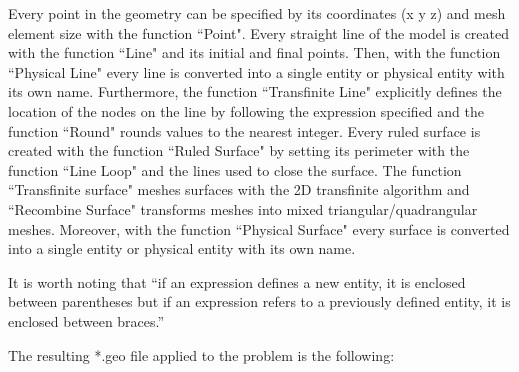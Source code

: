 \documentclass[a4]{article}
\begin{document}
Every point in the geometry can be specified by its coordinates (x y z) and mesh element size with the function ``Point". Every straight line of the model is created with the function ``Line" and its initial and final points. Then, with the function ``Physical Line" every line is converted into a single entity or physical entity with its own name. Furthermore, the function ``Transfinite Line" explicitly defines the location of the nodes on the line by following the expression specified and the function ``Round" rounds values to the nearest integer. Every ruled surface is created with the function ``Ruled Surface" by setting its perimeter with the function ``Line Loop" and the lines used to close the surface. The function ``Transfinite surface" meshes surfaces with the 2D transfinite algorithm and ``Recombine Surface" transforms meshes into mixed triangular/quadrangular meshes. Moreover, with the function ``Physical Surface" every surface is converted into a single entity or physical entity with its own name.  

It is worth noting that “if an expression defines a new entity, it is enclosed between parentheses but if an expression refers to a previously defined entity, it is enclosed between braces.” \cite{gmshweb}

The resulting *.geo file applied to the problem is the following:
\end{document}
